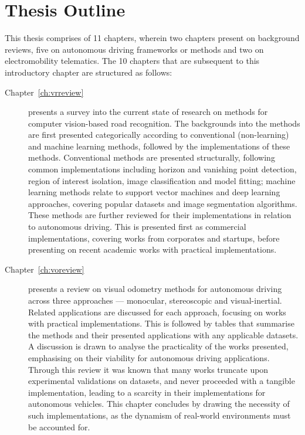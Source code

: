 
\section{Thesis Outline}
This thesis comprises of 11 chapters, wherein two chapters present on background reviews, five on autonomous driving frameworks or methods and two on electromobility telematics. The 10 chapters that are subsequent to this introductory chapter are structured as follows: 
\begin{description}
	\item[Chapter~\ref{ch:vrreview}] presents a survey into the current state of research on methods for computer vision-based road recognition. The backgrounds into the methods are first presented categorically according to conventional (non-learning) and machine learning methods, followed by the implementations of these methods. Conventional methods are presented structurally, following common implementations including horizon and vanishing point detection, region of interest isolation, image classification and model fitting; machine learning methods relate to support vector machines and deep learning approaches, covering popular datasets and image segmentation algorithms. These methods are further reviewed for their implementations in relation to autonomous driving. This is presented first as commercial implementations, covering works from corporates and startups, before presenting on recent academic works with practical implementations. 
	\item[Chapter~\ref{ch:voreview}] presents a review on visual odometry methods for autonomous driving across three approaches --- monocular, stereoscopic and visual-inertial. Related applications are discussed for each approach, focusing on works with practical implementations. This is followed by tables that summarise the methods and their presented applications with any applicable datasets. A discussion is drawn to analyse the practicality of the works presented, emphasising on their viability for autonomous driving applications. Through this review it was known that many works truncate upon experimental validations on datasets, and never proceeded with a tangible implementation, leading to a scarcity in their implementations for autonomous vehicles. This chapter concludes by drawing the necessity of such implementations, as the dynamism of real-world environments must be accounted for.

\end{description}
